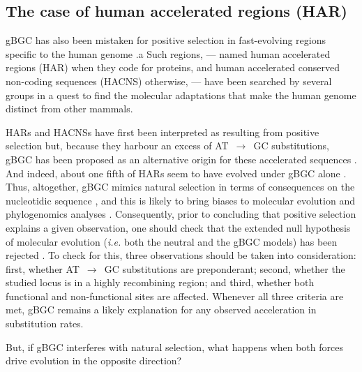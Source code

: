 \subsection{The case of human accelerated regions (HAR)}

gBGC has also been mistaken for positive selection in fast-evolving regions specific to the human genome \citep[reviewed in][]{duret2009biased}.a
Such regions, — named human accelerated regions (HAR) when they code for proteins, and human accelerated conserved non-coding sequences (HACNS) otherwise, — have been searched by several groups \citep{pollard2006forces,pollard2006rna,prabhakar2006accelerated,bird2007fastevolving,bush2008genomewide,lindblad-toh2011highresolution} in a quest to find the molecular adaptations that make the human genome distinct from other mammals.

HARs and HACNSs have first been interpreted as resulting from positive selection \citep[reviewed in][]{hubisz2014exploring} but, because they harbour an excess of AT~$\rightarrow$~GC substitutions, gBGC has been proposed as an alternative origin for these accelerated sequences \citep{galtier2007adaptation,berglund2009hotspots,duret2009comment,katzman2010gcbiased,ratnakumar2010detecting}.
And indeed, about one fifth of HARs seem to have evolved under gBGC alone \citep{kostka2012role}.\\


Thus, altogether, gBGC mimics natural selection in terms of consequences on the nucleotidic sequence \citep{bherer2014biased}, and this is likely to bring biases to molecular evolution and phylogenomics analyses \citep{berglund2009hotspots,ratnakumar2010detecting,webster2012direct,romiguier2013less,romiguier2016phylogenomics,romiguier2017analytical,bolivar2018biased,bolivar2019gcbiased,rousselle2019influence}.
Consequently, prior to concluding that positive selection explains a given observation, one should check that the extended null hypothesis of molecular evolution (\textit{i.e.} both the neutral and the gBGC models) has been rejected \citep{galtier2007adaptation, duret2009biased}.
To check for this, three observations should be taken into consideration: first, whether AT~$\rightarrow$~GC substitutions are preponderant; second, whether the studied locus is in a highly recombining region; and third, whether both functional and non-functional sites are affected.
Whenever all three criteria are met, gBGC remains a likely explanation for any observed acceleration in substitution rates.

But, if gBGC interferes with natural selection, what happens when both forces drive evolution in the opposite direction? 





